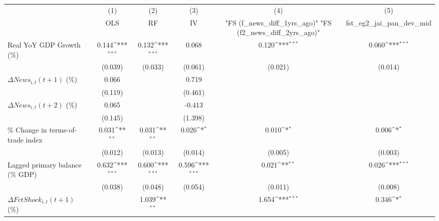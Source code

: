 {
\def\sym#1{\ifmmode^{#1}\else\(^{#1}\)\fi}
\begin{tabular}{l*{5}{c}}
\toprule
                    &\multicolumn{1}{c}{(1)}&\multicolumn{1}{c}{(2)}&\multicolumn{1}{c}{(3)}&\multicolumn{1}{c}{(4)}&\multicolumn{1}{c}{(5)}\\
                    &\multicolumn{1}{c}{OLS}&\multicolumn{1}{c}{RF}&\multicolumn{1}{c}{IV}&\multicolumn{1}{c}{ "FS (f_news_diff_1yrs_ago)"  "FS (f2_news_diff_2yrs_ago)" }&\multicolumn{1}{c}{fst_eg2_jai_pan_dev_mid}\\
\midrule
Real YoY GDP Growth (\%)&       0.144\sym{***}&       0.132\sym{***}&       0.068         &       0.120\sym{***}&       0.060\sym{***}\\
                    &     (0.039)         &     (0.033)         &     (0.061)         &     (0.021)         &     (0.014)         \\
\addlinespace
$ \Delta News_{i,t}(t+1)$ (\%)&       0.066         &                     &       0.719         &                     &                     \\
                    &     (0.119)         &                     &     (0.461)         &                     &                     \\
\addlinespace
$ \Delta News_{i,t}(t+2)$ (\%)&       0.065         &                     &      -0.413         &                     &                     \\
                    &     (0.145)         &                     &     (1.398)         &                     &                     \\
\addlinespace
\% Change in terms-of-trade index&       0.031\sym{**} &       0.031\sym{**} &       0.026\sym{*}  &       0.010\sym{*}  &       0.006\sym{*}  \\
                    &     (0.012)         &     (0.013)         &     (0.014)         &     (0.005)         &     (0.003)         \\
\addlinespace
Lagged primary balance (\% GDP)&       0.632\sym{***}&       0.600\sym{***}&       0.596\sym{***}&       0.021\sym{**} &       0.026\sym{***}\\
                    &     (0.038)         &     (0.048)         &     (0.054)         &     (0.011)         &     (0.008)         \\
\addlinespace
$ \Delta FctShock_{i,t}(t+1)$ (\%)&                     &       1.039\sym{**} &                     &       1.654\sym{***}&       0.346\sym{*}  \\

\end{tabular}}
